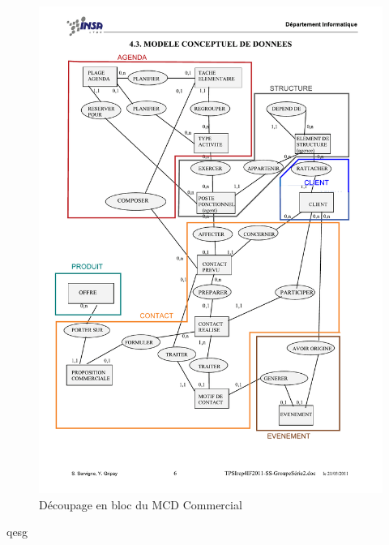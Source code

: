 \begin{figure}[H]
	\begin{center}
		\includegraphics[scale=0.4,clip, trim = 5mm 30mm 3mm 30mm]{Includes/SOA-Blocs-2.pdf}
		\caption{Découpage en bloc du MCD Commercial}
	\end{center}
\end{figure}
qesg